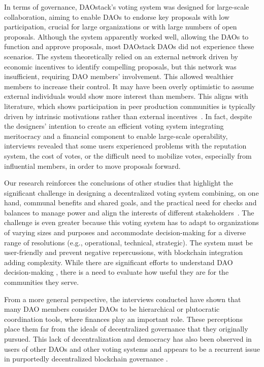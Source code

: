 \documentclass[10pt,lineno]{wlpeerj}
\begin{document}
In terms of governance, DAOstack’s voting system was designed for large-scale collaboration, aiming to enable DAOs to endorse key proposals with low participation, crucial for large organizations or with large numbers of open proposals. Although the system apparently worked well, allowing the DAOs to function and approve proposals, most DAOstack DAOs did not experience these scenarios. The system theoretically relied on an external network driven by economic incentives to identify compelling proposals, but this network was insufficient, requiring DAO members’ involvement. This allowed wealthier members to increase their control. It may have been overly optimistic to assume external individuals would show more interest than members. This aligns with literature, which shows participation in peer production communities is typically driven by intrinsic motivations rather than external incentives~\citep{Xu2015}. In fact, despite the designers' intention to create an efficient voting system integrating meritocracy and a financial component to enable large-scale operability, interviews revealed that some users experienced problems with the reputation system, the cost of votes, or the difficult need to mobilize votes, especially from influential members, in order to move proposals forward.





Our research reinforces the conclusions of other studies that highlight the significant challenge in designing a decentralized voting system combining, on one hand, communal benefits and shared goals, and the practical need for checks and balances to manage power and align the interests of different stakeholders~\citep{alawadi_decentralized_2024}. The challenge is even greater because this voting system has to adapt to organizations of varying sizes and purposes and accommodate decision-making for a diverse range of resolutions (e.g., operational, technical, strategic). The system must be user-friendly and prevent negative repercussions, with blockchain integration adding complexity. While there are significant efforts to understand DAO decision-making \citep{Spychiger2025}, there is a need to evaluate how useful they are for the communities they serve.

From a more general perspective, the interviews conducted have shown that many DAO members consider DAOs to be hierarchical or plutocratic coordination tools, where finances play an important role. These perceptions place them far from the ideals of decentralized governance that they originally pursued. This lack of decentralization and democracy has also been observed in users of other DAOs and other voting systems \citep{gilson_enhancing_2024} and appears to be a recurrent issue in purportedly decentralized blockchain governance \citep{schadler2023}. 
\end{document}
